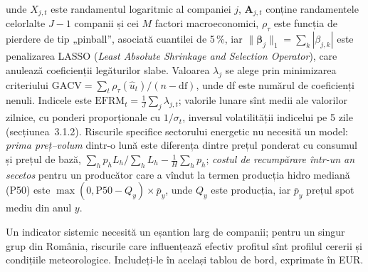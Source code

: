 {unde $X_{j,t}$ este randamentul logaritmic al companiei $j$, $\mathbf A_{j,t}$ conține randamentele celorlalte $J-1$ companii și cei $M$ factori macroeconomici, $\rho_\tau$ este funcția de pierdere de tip „pinball”, asociată cuantilei de 5\,\%, iar $\|\boldsymbol\beta_j\|_1=\sum_k|\beta_{j,k}|$ este penalizarea LASSO (\emph{Least Absolute Shrinkage and Selection Operator}), care anulează coeficienții legăturilor slabe.
Valoarea $\lambda_j$ se alege prin minimizarea criteriului $\mathrm{GACV}=\sum_t\rho_\tau(\hat u_t)/(n-\mathrm{df})$, unde df este numărul de coeficienți nenuli. Indicele este $\mathrm{EFRM}_t=\frac1J\sum_j\lambda_{j,t}$;
valorile lunare sînt medii ale valorilor zilnice, cu ponderi proporționale cu $1/\sigma_t$, inversul volatilității indicelui pe 5 zile (secțiunea~3.1.2).
Riscurile specifice sectorului energetic nu necesită un model: \emph{prima preț--volum} dintr-o lună este diferența dintre prețul ponderat cu consumul și prețul de bază, $\sum_h p_hL_h/\sum_hL_h-\frac1H\sum_hp_h$;
\emph{costul de recumpărare într-un an secetos} pentru un producător care a vîndut la termen producția hidro mediană (P50) este $\max(0,\mathrm{P50}-Q_y)\times\bar p_y$, unde $Q_y$ este producția, iar $\bar p_y$ prețul spot mediu din anul $y$.}
\begin{decision}
%
{Un indicator sistemic necesită un eșantion larg de companii; pentru un singur grup din România, riscurile care influențează efectiv profitul sînt profilul cererii și condițiile meteorologice.
Includeți-le în același tablou de bord, exprimate în EUR.}
\end{decision}


